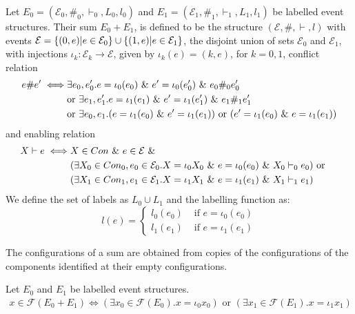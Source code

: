 \documentclass{article}
\begin{document}
\begin{definition}
    Let $E_0 = (\mathcal{E}_0,\#_0,\vdash_0,L_0,l_0)$ and
    $E_1 = (\mathcal{E}_1,\#_1,\vdash_1,L_1,l_1)$ be labelled event structures.
    Their sum $E_0 + E_1$, is defined to be the structure $(\mathcal{E},\#,\vdash,l)$
    with events $\mathcal{E} = \{(0,e)|e \in \mathcal{E}_0\} \cup \{(1,e)|e \in \mathcal{E}_1\}$,
    the disjoint union of sets $\mathcal{E}_0$ and $\mathcal{E}_1$,
    with injections $\iota_k: \mathcal{E}_k \rightarrow \mathcal{E}$, given by
    $\iota_k(e) = (k,e)$, for $k=0,1$, conflict relation
    \begin{align*}
        e \# e' \iff & \exists e_0,e_0'. e = \iota_0(e_0)
        \ \& \  e' = \iota_0(e_0') \ \& \  e_0 \#_0e_0'                         \\
                     & \text{or } \exists e_1,e_1'. e = \iota_1(e_1) \ \& \ 
        e' = \iota_1(e_1') \ \& \  e_1 \#_1 e_1'                             \\
                     & \text{or } \exists e_0,e_1.(e=\iota_1(e_0)
        \ \& \  e' =\iota_1(e_1)) \text{ or }
        (e'=\iota_1(e_0) \ \& \  e =\iota_1(e_1))
    \end{align*}
    and enabling relation
    \begin{align*}
        X \vdash e \iff & X \in Con \ \& \  e \in \mathcal{E} \ \& \                        & \\
                        & (\exists X_0 \in Con_0,e_0 \in \mathcal{E}_0.X = \iota_0X_0
        \ \& \  e = \iota_0(e_0) \ \& \  X_0 \vdash_0 e_0) \text{ or }                        \\
                        & (\exists X_1 \in Con_1,e_1 \in \mathcal{E}_1.X = \iota_1X_1
        \ \& \  e = \iota_1(e_1) \ \& \  X_1 \vdash_1 e_1)                                    \\
    \end{align*}
    We define the set of labels as $L_0 \cup L_1$ and the labelling function as:
    $$
        l(e) = \begin{cases}
            l_0(e_0) & \text{ if } e = \iota_0(e_0) \\
            l_1(e_1) & \text{ if } e = \iota_1(e_1)
        \end{cases}
    $$
\end{definition}
The configurations of a sum are obtained from copies of the configurations of the components
identified at their empty configurations.

\begin{proposition}

    Let $E_0$ and $E_1$ be labelled event structures.
    \begin{align*}
        x \in \mathcal{F}(E_0+E_1) \iff (\exists x_0 \in \mathcal{F}(E_0).x=\iota_0x_0)
        \text{ or } (\exists x_1 \in \mathcal{F}(E_1).x=\iota_1x_1)
    \end{align*}

\end{proposition}
\end{document}
